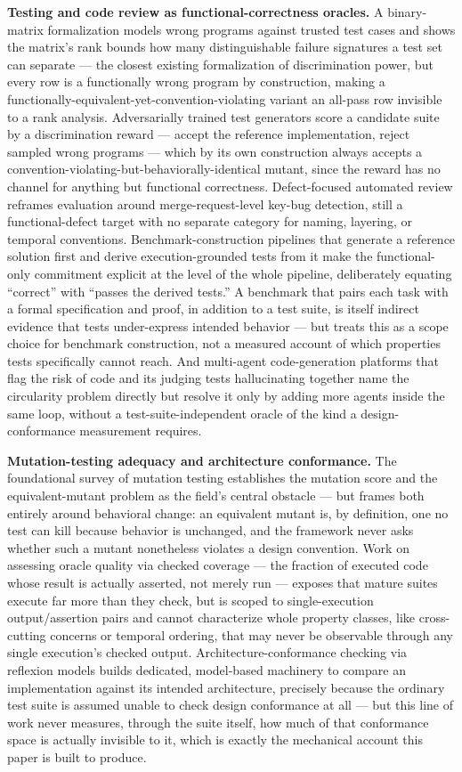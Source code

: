 \documentclass[11pt]{article}
\begin{document}
\textbf{Testing and code review as functional-correctness oracles.} A binary-matrix formalization models wrong programs against trusted test cases and shows the matrix's rank bounds how many distinguishable failure signatures a test set can separate --- the closest existing formalization of discrimination power, but every row is a functionally wrong program by construction, making a functionally-equivalent-yet-convention-violating variant an all-pass row invisible to a rank analysis. Adversarially trained test generators score a candidate suite by a discrimination reward --- accept the reference implementation, reject sampled wrong programs --- which by its own construction always accepts a convention-violating-but-behaviorally-identical mutant, since the reward has no channel for anything but functional correctness. Defect-focused automated review reframes evaluation around merge-request-level key-bug detection, still a functional-defect target with no separate category for naming, layering, or temporal conventions. Benchmark-construction pipelines that generate a reference solution first and derive execution-grounded tests from it make the functional-only commitment explicit at the level of the whole pipeline, deliberately equating ``correct'' with ``passes the derived tests.'' A benchmark that pairs each task with a formal specification and proof, in addition to a test suite, is itself indirect evidence that tests under-express intended behavior --- but treats this as a scope choice for benchmark construction, not a measured account of which properties tests specifically cannot reach. And multi-agent code-generation platforms that flag the risk of code and its judging tests hallucinating together name the circularity problem directly but resolve it only by adding more agents inside the same loop, without a test-suite-independent oracle of the kind a design-conformance measurement requires.

\textbf{Mutation-testing adequacy and architecture conformance.} The foundational survey of mutation testing establishes the mutation score and the equivalent-mutant problem as the field's central obstacle --- but frames both entirely around behavioral change: an equivalent mutant is, by definition, one no test can kill because behavior is unchanged, and the framework never asks whether such a mutant nonetheless violates a design convention. Work on assessing oracle quality via checked coverage --- the fraction of executed code whose result is actually asserted, not merely run --- exposes that mature suites execute far more than they check, but is scoped to single-execution output/assertion pairs and cannot characterize whole property classes, like cross-cutting concerns or temporal ordering, that may never be observable through any single execution's checked output. Architecture-conformance checking via reflexion models builds dedicated, model-based machinery to compare an implementation against its intended architecture, precisely because the ordinary test suite is assumed unable to check design conformance at all --- but this line of work never measures, through the suite itself, how much of that conformance space is actually invisible to it, which is exactly the mechanical account this paper is built to produce.
\end{document}
